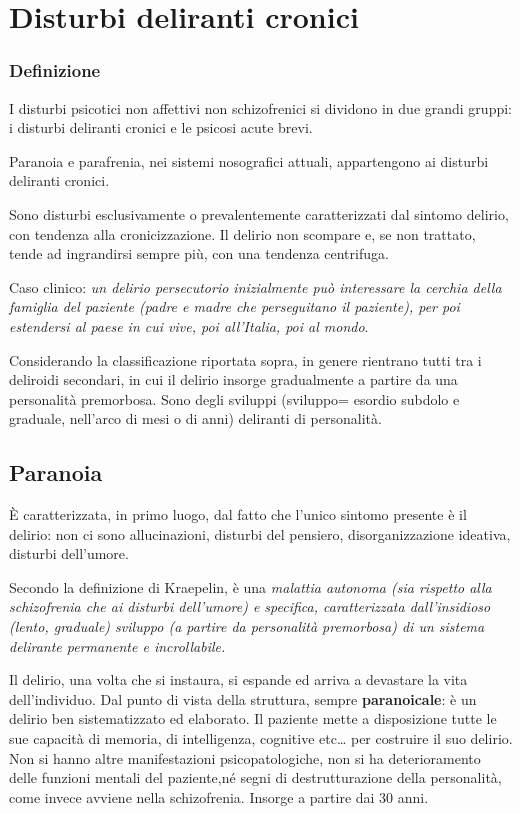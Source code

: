 \section{Disturbi deliranti cronici}

\subsubsection{Definizione}

I disturbi psicotici non affettivi non schizofrenici si dividono in due
grandi gruppi: i disturbi deliranti cronici e le psicosi acute brevi.

Paranoia e parafrenia, nei sistemi nosografici attuali, appartengono ai
disturbi deliranti cronici.

Sono disturbi esclusivamente o prevalentemente caratterizzati dal
sintomo delirio, con tendenza alla cronicizzazione. Il delirio non
scompare e, se non trattato, tende ad ingrandirsi sempre più, con una
tendenza centrifuga.

Caso clinico: \emph{un delirio persecutorio inizialmente può interessare
la cerchia della famiglia del paziente (padre e madre che perseguitano
il paziente), per poi estendersi al paese in cui vive, poi all'Italia,
poi al mondo}.

Considerando la classificazione riportata sopra, in genere rientrano
tutti tra i deliroidi secondari, in cui il delirio insorge gradualmente
a partire da una personalità premorbosa. Sono degli sviluppi (sviluppo=
esordio subdolo e graduale, nell'arco di mesi o di anni) deliranti di
personalità.

\subsection{Paranoia}

È caratterizzata, in primo luogo, dal fatto che l'unico sintomo presente
è il delirio: non ci sono allucinazioni, disturbi del pensiero,
disorganizzazione ideativa, disturbi dell'umore.

Secondo la definizione di Kraepelin, è una \emph{malattia autonoma (sia
rispetto alla schizofrenia che ai disturbi dell'umore) e specifica,
caratterizzata dall'insidioso (lento, graduale) sviluppo (a partire da
personalità premorbosa) di un sistema delirante permanente e
incrollabile. }

Il delirio, una volta che si instaura, si espande ed arriva a devastare
la vita dell'individuo. Dal punto di vista della struttura, sempre
\textbf{paranoicale}: è un delirio ben sistematizzato ed elaborato. Il
paziente mette a disposizione tutte le sue capacità di memoria, di
intelligenza, cognitive etc\ldots{} per costruire il suo delirio. Non si
hanno altre manifestazioni psicopatologiche, non si ha deterioramento
delle funzioni mentali del paziente,né segni di destrutturazione della
personalità, come invece avviene nella schizofrenia. Insorge a partire
dai 30 anni.

